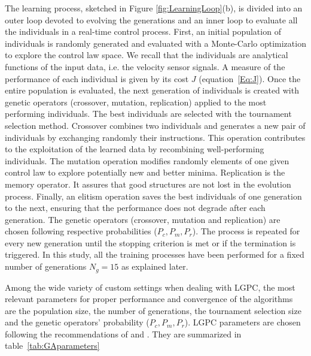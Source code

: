 The learning process, sketched in Figure \ref{fig:LearningLoop}(b), is divided into an outer loop devoted to evolving the generations and an inner loop to evaluate all the individuals in a real-time control process. First, an initial population of individuals is randomly generated and evaluated with a Monte-Carlo optimization to explore the control law space. We recall that the individuals are analytical functions of the input data, i.e. the velocity sensor signals. A measure of the performance of each individual is given by its cost $J$ (equation~\ref{Eq:J}). Once the entire population is evaluated, the next generation of individuals is created with genetic operators (crossover, mutation, replication) applied to the most performing individuals. The best individuals are selected with the tournament selection method. Crossover combines two individuals and generates a new pair of individuals by exchanging randomly their instructions. This operation contributes to the exploitation of the learned data by recombining well-performing individuals. The mutation operation modifies randomly elements of one given control law to explore potentially new and better minima. Replication is the memory operator. It assures that good structures are not lost in the evolution process. Finally, an elitism operation saves the best individuals of one generation to the next, ensuring that the performance does not degrade after each generation. The genetic operators (crossover, mutation and replication) are chosen following respective probabilities ($P_c,P_m,P_r$). The process is repeated for every new generation until the stopping criterion is met or if the termination is triggered. In this study, all the training processes have been performed for a fixed number of generations $N_{g} = 15$ as explained later.  

Among the wide variety of custom settings when dealing with LGPC, the most relevant parameters for proper performance and convergence of the algorithms are the population size, the number of generations, the tournament selection size and the genetic operators' probability ($P_c,P_m,P_r$). LGPC parameters are chosen following the recommendations of \citet{duriez2017book} and \citet{li2017GP}. They are summarized in table~\ref{tab:GAparameters}

